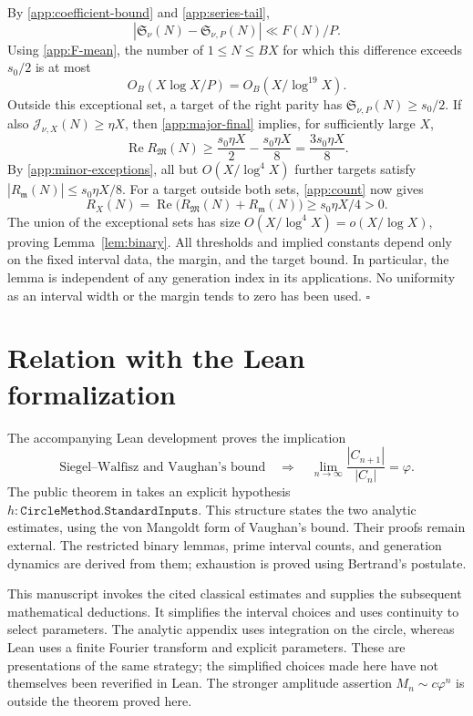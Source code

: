 \documentclass[11pt,letterpaper]{article}
\numberwithin{equation}{section}
\theoremstyle{definition}
\theoremstyle{remark}
\newcommand{\ph}{\varphi}
\begin{document}
By \eqref{app:coefficient-bound} and \eqref{app:series-tail},
\[
 |\mathfrak S_\nu(N)-\mathfrak S_{\nu,P}(N)|\ll F(N)/P.
\]
Using \eqref{app:F-mean}, the number of $1\le N\le BX$ for which
this difference exceeds $s_0/2$ is at most
\begin{equation}\label{app:series-exceptions}
 O_B(X\log X/P)=O_B(X/\log^{19}X).
\end{equation}
Outside this exceptional set, a target of the right parity has
$\mathfrak S_{\nu,P}(N)\ge s_0/2$.
If also $\mathcal J_{\nu,X}(N)\ge\eta X$, then
\eqref{app:major-final} implies, for sufficiently large $X$,
\[
 \operatorname{Re}R_{\mathfrak M}(N)
 \ge\frac{s_0\eta X}{2}-\frac{s_0\eta X}{8}
 =\frac{3s_0\eta X}{8}.
\]
By \eqref{app:minor-exceptions}, all but $O(X/\log^4X)$ further
targets satisfy $|R_{\mathfrak m}(N)|\le s_0\eta X/8$.
For a target outside both sets, \eqref{app:count} now gives
\[
 R_X(N)=\operatorname{Re}\bigl(R_{\mathfrak M}(N)
                             +R_{\mathfrak m}(N)\bigr)
 \ge s_0\eta X/4>0.
\]
The union of the exceptional sets has size
$O(X/\log^4X)=o(X/\log X)$, proving Lemma~\ref{lem:binary}.
All thresholds and implied constants depend only on the fixed interval
data, the margin, and the target bound. In particular, the lemma is
independent of any generation index in its applications. No uniformity
as an interval width or the margin tends to zero has been used.
\hfill$\square$

\section{Relation with the Lean formalization}\label{app:formal}

The accompanying Lean development proves the implication
\[
 \text{Siegel--Walfisz and Vaughan's bound}
 \quad\Longrightarrow\quad
 \lim_{n\to\infty}\frac{|C_{n+1}|}{|C_n|}=\ph.
\]
The public theorem in
takes an explicit hypothesis $h:\texttt{CircleMethod.StandardInputs}$.
This structure states the two analytic estimates, using the von Mangoldt
form of Vaughan's bound. Their proofs remain external. The restricted
binary lemmas, prime interval counts, and generation dynamics are derived
from them; exhaustion is proved using Bertrand's postulate.

This manuscript invokes the cited classical estimates and supplies the
subsequent mathematical deductions. It simplifies the interval choices and
uses continuity to select parameters. The analytic appendix uses integration
on the circle, whereas Lean uses a finite Fourier transform and explicit
parameters. These are presentations of the same strategy; the simplified
choices made here have not themselves been reverified in Lean. The stronger
amplitude assertion $M_n\sim c\ph^n$ is outside the theorem proved here.
\end{document}
